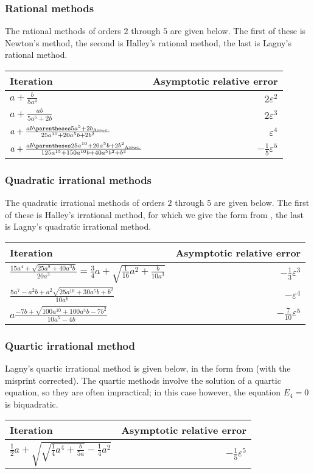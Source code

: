 ﻿\documentclass[10pt, a4paper, twoside]{basestyle}
\begin{document}
\subsubsection{Rational methods}
The rational methods of orders $2$ through $5$ are given below. The first of these is Newton's method, the second is Halley's rational method,
the last is Lagny's rational method.
\begin{center}
\begin{tabular}{lr}
 Iteration & Asymptotic relative error\\
\hline
$a+\frac{b}{5a^4}$ & $2ε^2$ \\
$a+\frac{ab}{5a^5+2b}$ & $2ε^3$\\
$a+\frac{ab\pa{5a^5+2b}}{25a^{10}+20a^5b+2b^2}$ & $ε^4$\\
$a+\frac{ab\pa{25a^{10}+20a^5b+2b^2}}{125a^{15}+150a^{10}b+40a^5b^2+b^3}$ & $-\tfrac{1}{5}ε^5$\\
\end{tabular}
\end{center}
\subsubsection{Quadratic irrational methods}
The quadratic irrational methods of orders $2$ through $5$ are given below. The first of these is Halley's irrational method, for which we give
the form from \cite[141]{Halley1694}, the last is Lagny's quadratic irrational method.
\begin{center}
\begin{tabular}{lr}
Iteration & Asymptotic relative error\\
\hline
$\frac{15a^4+\sqrt{25a^8+40a^3b}}{20a^3}=\tfrac{3}{4}a+\sqrt{\tfrac{1}{16}a^2+\frac{b}{10a^3}}$ &  $-\tfrac{1}{3}ε^3$ \\
$\frac{5a^7-a^2b+a^2\sqrt{25a^{10}+30a^5b+b^2}}{10a^6}$ & $-ε^4$ \\
$a\frac{-7b+\sqrt{100a^{10}+100a^5b-7b^2}}{10a^5-4b}$ & $-\tfrac{7}{10}ε^5$ \\
\end{tabular}
\end{center}
\subsubsection{Quartic irrational method}
Lagny's quartic irrational method is given below, in the form from \cite{FantetdeLagny1692} (with the misprint corrected).
The quartic methods involve the solution of a quartic equation, so they are often impractical;
in this case however, the equation $E_4=0$ is biquadratic.
\begin{center}
\begin{tabular}{lr}
Iteration & Asymptotic relative error\\
\hline
$\tfrac{1}{2}a+\sqrt{\sqrt{\tfrac{1}{4}a^4+\tfrac{b}{5a}}-\tfrac{1}{4}a^2}$&$-\tfrac{1}{5}ε^5$
\end{tabular}
\end{center}
\end{document}
